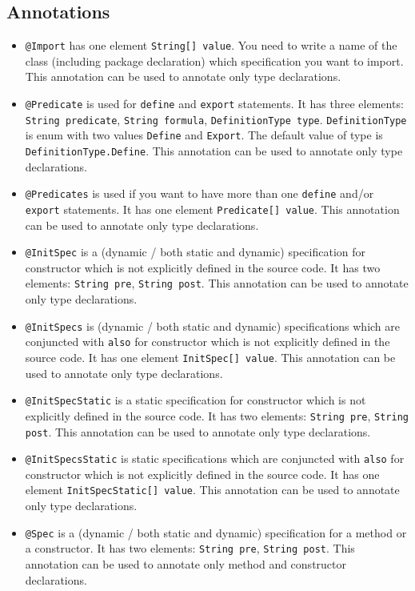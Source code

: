 \documentclass{article}
\begin{document}
\subsection*{Annotations}

\begin{itemize}
\item \texttt{@Import} has one element \texttt{String[] value}. You need to write a name of the class (including package declaration) which specification you want to import. This annotation can be used to annotate only type declarations.
\item \texttt{@Predicate} is used for \texttt{define} and \texttt{export} statements. It has three elements: \texttt{String predicate}, \texttt{String formula}, \texttt{DefinitionType type}. \texttt{DefinitionType} is enum with two values \texttt{Define} and \texttt{Export}.  The default value of type is \texttt{DefinitionType.Define}. This annotation can be used to annotate only type declarations.
\item \texttt{@Predicates} is used if you want to have more than one  \texttt{define} and/or \texttt{export} statements. It has one element \texttt{Predicate[] value}. This annotation can be used to annotate only type declarations.
\item \texttt{@InitSpec} is a (dynamic / both static and dynamic) specification for constructor which is not explicitly defined in the source code. It has two elements: \texttt{String pre}, \texttt{String post}. This annotation can be used to annotate only type declarations.
\item \texttt{@InitSpecs} is (dynamic / both static and dynamic) specifications which are conjuncted with \texttt{also} for constructor which is not explicitly defined in the source code. It has one element \texttt{InitSpec[] value}. This annotation can be used to annotate only type declarations.
\item \texttt{@InitSpecStatic} is a static specification for constructor which is not explicitly defined in the source code. It has two elements: \texttt{String pre}, \texttt{String post}. This annotation can be used to annotate only type declarations.
\item \texttt{@InitSpecsStatic} is static specifications which are conjuncted with \texttt{also} for constructor which is not explicitly defined in the source code. It has one element \texttt{InitSpecStatic[] value}. This annotation can be used to annotate only type declarations.
\item \texttt{@Spec} is a (dynamic / both static and dynamic) specification for a method or a constructor. It has two elements: \texttt{String pre}, \texttt{String post}. This annotation can be used to annotate only method and constructor declarations.

\end{itemize}
\end{document}
